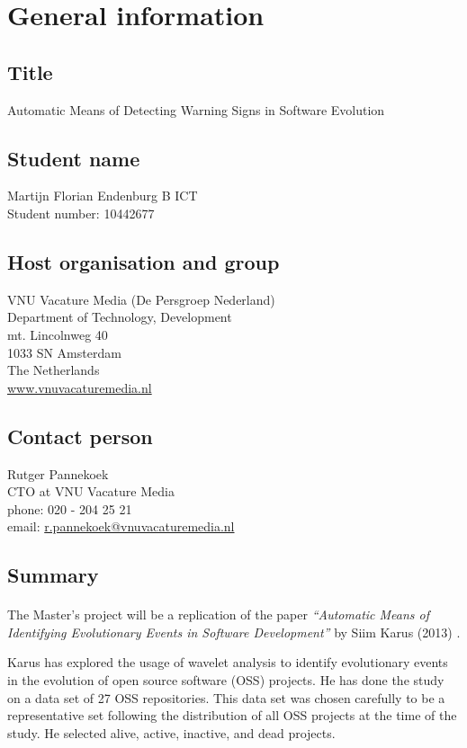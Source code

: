 \section{General information}
\subsection{Title}
Automatic Means of Detecting Warning Signs in Software Evolution

\subsection{Student name}
Martijn Florian Endenburg B ICT \\
Student number: 10442677

\subsection{Host organisation and group}
VNU Vacature Media (De Persgroep Nederland) \\
Department of Technology, Development \\
mt. Lincolnweg 40 \\
1033 SN Amsterdam \\
The Netherlands \\
\href{http://www.vnuvacaturemedia.nl}{www.vnuvacaturemedia.nl}

\subsection{Contact person}
Rutger Pannekoek \\
CTO at VNU Vacature Media \\
phone: 020 - 204 25 21 \\
email:
\href{mailto:r.pannekoek@vnuvacaturemedia.nl}{r.pannekoek@vnuvacaturemedia.nl}

\subsection{Summary}
\paragraph{}
The Master's project will be a replication of the paper \emph{``Automatic Means
of Identifying Evolutionary Events in Software Development''} by Siim Karus
(2013) \cite{karus2013}.

Karus has explored the usage of wavelet analysis to identify evolutionary events
in the evolution of open source software (OSS) projects. He has done the study
on a data set of 27 OSS repositories. This data set was chosen carefully to be a
representative set following the distribution of all OSS projects at the time of
the study. He selected alive, active, inactive, and dead projects.

